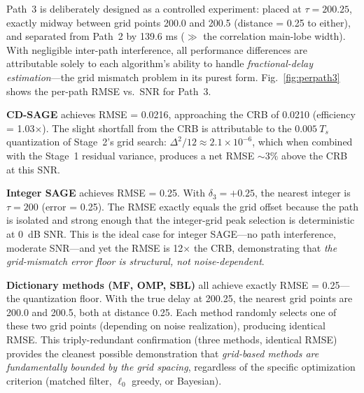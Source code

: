 \documentclass[a4paper,fleqn]{cas-dc}
\begin{document}
Path~3 is deliberately designed as a controlled experiment: placed at $\tau = 200.25$, exactly midway between grid points 200.0 and 200.5 (distance = 0.25 to either), and separated from Path~2 by 139.6 ms ($\gg$ the correlation main-lobe width). With negligible inter-path interference, all performance differences are attributable solely to each algorithm's ability to handle \textit{fractional-delay estimation}---the grid mismatch problem in its purest form. Fig.~\ref{fig:perpath3} shows the per-path RMSE vs.\ SNR for Path~3.

\textbf{CD-SAGE} achieves RMSE = 0.0216, approaching the CRB of 0.0210 (efficiency = 1.03$\times$). The slight shortfall from the CRB is attributable to the $0.005\ T_s$ quantization of Stage~2's grid search: $\Delta^2/12 \approx 2.1\times 10^{-6}$, which when combined with the Stage~1 residual variance, produces a net RMSE $\sim 3\%$ above the CRB at this SNR.

\textbf{Integer SAGE} achieves RMSE = 0.25. With $\delta_3 = +0.25$, the nearest integer is $\tau = 200$ (error = 0.25). The RMSE exactly equals the grid offset because the path is isolated and strong enough that the integer-grid peak selection is deterministic at 0~dB SNR. This is the ideal case for integer SAGE---no path interference, moderate SNR---and yet the RMSE is 12$\times$ the CRB, demonstrating that \textit{the grid-mismatch error floor is structural, not noise-dependent}.

\textbf{Dictionary methods (MF, OMP, SBL)} all achieve exactly RMSE = 0.25---the quantization floor. With the true delay at 200.25, the nearest grid points are 200.0 and 200.5, both at distance 0.25. Each method randomly selects one of these two grid points (depending on noise realization), producing identical RMSE. This triply-redundant confirmation (three methods, identical RMSE) provides the cleanest possible demonstration that \textit{grid-based methods are fundamentally bounded by the grid spacing}, regardless of the specific optimization criterion (matched filter, $\ell_0$ greedy, or Bayesian).
\end{document}
